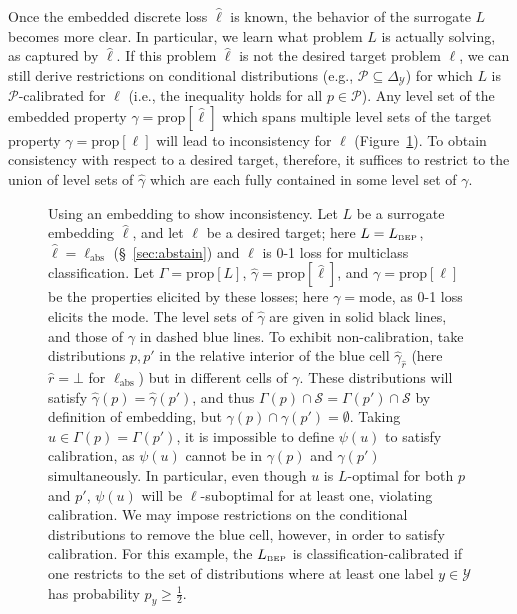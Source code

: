 \documentclass[twoside,11pt]{article}
\newcommand{\prop}[1]{\mathrm{prop}[#1]}
\newcommand{\BEP}{L_{\text{\tiny BEP}}}
\newcommand{\ellabstain}{\ell_{\text{abs}}}
\newcommand{\mode}{\mathrm{mode}}
\newcommand{\simplex}{\Delta_\Y}
\renewcommand{\P}{\mathcal{P}}
\newcommand{\Sc}{\mathcal{S}}
\newcommand{\Y}{\mathcal{Y}}
\begin{document}
Once the embedded discrete loss $\hat\ell$ is known, the behavior of the surrogate $L$ becomes more clear.
In particular, we learn what problem $L$ is actually solving, as captured by $\hat\ell$.
If this problem $\hat\ell$ is not the desired target problem $\ell$, we can still derive restrictions on conditional distributions (e.g., $\P \subseteq \simplex$) for which $L$ is $\P$-calibrated for $\ell$ (i.e., the inequality holds for all $p \in \P$).
Any level set of the embedded property $\hat\gamma = \prop{\hat\ell}$ which spans multiple level sets of the target property $\gamma=\prop{\ell}$ will lead to inconsistency for $\ell$ (Figure~\ref{fig:abstain-intuition-inconsistent}).
To obtain consistency with respect to a desired target, therefore, it suffices to restrict to the union of level sets of $\hat\gamma$ which are each fully contained in some level set of $\gamma$.

\begin{figure}
	\begin{minipage}{0.28\linewidth}
    
\end{minipage}
\begin{minipage}{0.72\linewidth}
	\caption{Using an embedding to show inconsistency.
    Let $L$ be a surrogate embedding $\hat \ell$, and let $\ell$ be a desired target; here $L=\BEP$, $\hat\ell = \ellabstain$ (\S~\ref{sec:abstain}) and $\ell$ is 0-1 loss for multiclass classification.
    Let $\Gamma = \prop{L}$, $\hat\gamma = \prop{\hat\ell}$, and $\gamma = \prop{\ell}$ be the properties elicited by these losses; here $\gamma = \mode$, as 0-1 loss elicits the mode.
    The level sets of $\hat\gamma$ are given in solid black lines, and those of $\gamma$ in dashed blue lines.
    To exhibit non-calibration, take distributions $p, p'$ in the relative interior of the blue cell $\hat \gamma_{\hat r}$ (here $\hat r=\bot$ for $\ellabstain$) but in different cells of $\gamma$.
    These distributions will satisfy $\hat\gamma(p) = \hat\gamma(p')$, and thus $\Gamma(p) \cap \Sc = \Gamma(p') \cap \Sc$ by definition of embedding, but $\gamma(p) \cap \gamma(p') = \emptyset$.
    Taking $u\in\Gamma(p)=\Gamma(p')$, it is impossible to define $\psi(u)$ to satisfy calibration, as $\psi(u)$ cannot be in $\gamma(p)$ and $\gamma(p')$ simultaneously.
    In particular, even though $u$ is $L$-optimal for both $p$ and $p'$, $\psi(u)$ will be $\ell$-suboptimal for at least one, violating calibration.
    We may impose restrictions on the conditional distributions to remove the blue cell, however, in order to satisfy calibration.
    For this example, the $\BEP$ is classification-calibrated if one restricts to the set of distributions where at least one label $y\in\Y$ has probability $p_y \geq \tfrac 1 2$.
	}
	\label{fig:abstain-intuition-inconsistent}
	\end{minipage}
\end{figure}
\end{document}
